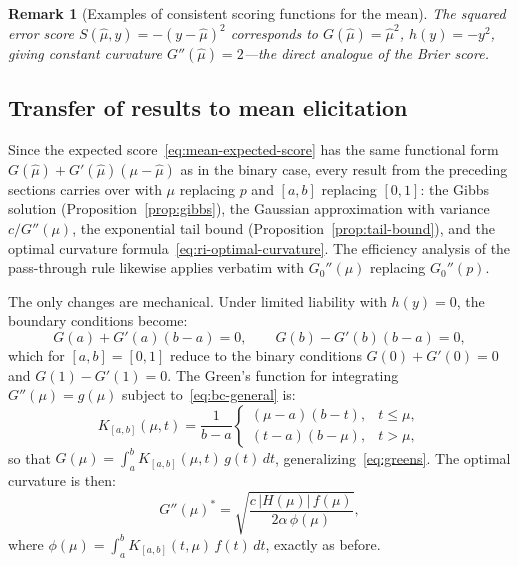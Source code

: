 \documentclass[11pt]{article}
\newtheorem{remark}{Remark}
\begin{document}
\begin{remark}[Examples of consistent scoring functions for the mean]
The \emph{squared error} score $S(\hat{\mu}, y) = -(y - \hat{\mu})^2$ corresponds to $G(\hat{\mu}) = \hat{\mu}^2$, $h(y) = -y^2$, giving constant curvature $G''(\hat{\mu}) = 2$---the direct analogue of the Brier score.
\end{remark}


\subsection{Transfer of results to mean elicitation}

Since the expected score~\eqref{eq:mean-expected-score} has the same functional form $G(\hat{\mu}) + G'(\hat{\mu})(\mu - \hat{\mu})$ as in the binary case, every result from the preceding sections carries over with $\mu$ replacing $p$ and $[a,b]$ replacing $[0,1]$: the Gibbs solution (Proposition~\ref{prop:gibbs}), the Gaussian approximation with variance $c/G''(\mu)$, the exponential tail bound (Proposition~\ref{prop:tail-bound}), and the optimal curvature formula~\eqref{eq:ri-optimal-curvature}. The efficiency analysis of the pass-through rule likewise applies verbatim with $G_0''(\mu)$ replacing $G_0''(p)$.

The only changes are mechanical. Under limited liability with $h(y) = 0$, the boundary conditions become:
\begin{equation}\label{eq:bc-general}
G(a) + G'(a)(b - a) = 0, \qquad G(b) - G'(b)(b - a) = 0,
\end{equation}
which for $[a,b] = [0,1]$ reduce to the binary conditions $G(0) + G'(0) = 0$ and $G(1) - G'(1) = 0$. The Green's function for integrating $G''(\mu) = g(\mu)$ subject to~\eqref{eq:bc-general} is:
\begin{equation}\label{eq:kernel-general}
K_{[a,b]}(\mu, t) = \frac{1}{b-a}\begin{cases} (\mu - a)(b - t), & t \leq \mu, \\ (t - a)(b - \mu), & t > \mu, \end{cases}
\end{equation}
so that $G(\mu) = \int_a^b K_{[a,b]}(\mu, t)\, g(t)\, dt$, generalizing~\eqref{eq:greens}. The optimal curvature is then:
\begin{equation}\label{eq:optimal-curvature-mean}
G''(\mu)^* = \sqrt{\frac{c\,|H(\mu)|\,f(\mu)}{2\alpha\,\phi(\mu)}},
\end{equation}
where $\phi(\mu) = \int_a^b K_{[a,b]}(t, \mu)\, f(t)\, dt$, exactly as before.
\end{document}
